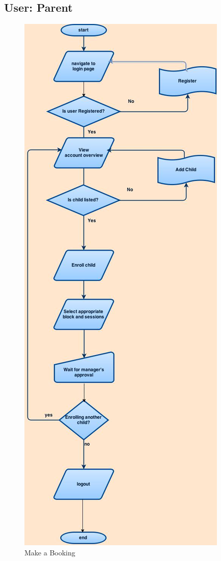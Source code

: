 \documentclass{l3proj}
\begin{document}
\pagebreak
\subsection{User: Parent}

{
\begin{figure}[h]
\caption{Make a Booking}
\centering
\includegraphics[scale=0.30]{Parent(MakeABooking).jpg}
\end{figure}
}
\end{document}
